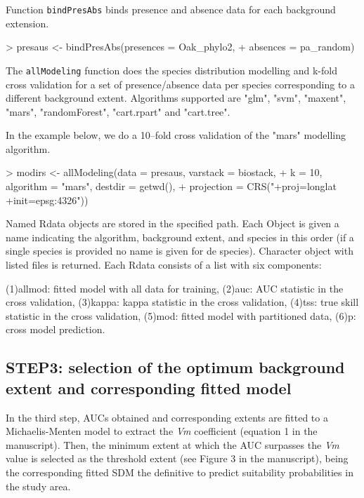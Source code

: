 \documentclass[10pt,a4paper]{article}
\begin{document}
Function \texttt{bindPresAbs} binds presence and absence data for each background extension.

\begin{Schunk}
\begin{Sinput}
> presaus <- bindPresAbs(presences = Oak_phylo2, 
+                        absences = pa_random)
\end{Sinput}
\end{Schunk}


The \texttt{allModeling} function does the species distribution modelling and k-fold cross validation for a set of presence/absence data per species corresponding to a different background 
extent. Algorithms supported are "glm", "svm", "maxent", "mars", "randomForest", "cart.rpart" 
and "cart.tree".

In the example below, we do a 10--fold cross validation of the "mars" modelling algorithm.

\begin{Schunk}
\begin{Sinput}
> modirs <- allModeling(data = presaus, varstack = biostack, 
+             k = 10, algorithm = "mars", destdir = getwd(), 
+             projection = CRS("+proj=longlat +init=epsg:4326"))
\end{Sinput}
\end{Schunk}

Named Rdata objects are stored in the specified path. Each Object is given a name indicating the algorithm, background extent, and species in this order (if a single species is provided no name is given for de species). Character object with listed files is returned. Each Rdata consists of a list with six components:

	(1)allmod: fitted model with all data for training, 
	(2)auc: AUC statistic in the cross validation,
	(3)kappa: kappa statistic in the cross validation,
	(4)tss: true skill statistic in the cross validation,
	(5)mod: fitted model with partitioned data, 
	(6)p: cross model prediction. 

\subsection{STEP3: selection of the optimum background extent and corresponding fitted model}

In the third step, AUCs obtained and corresponding extents are fitted to a Michaelis-Menten model to extract the \textit{Vm} coefficient (equation 1 in the manuscript). Then, the minimum extent at which the AUC surpasses the \textit{Vm} value is selected as the threshold extent (see Figure 3 in the manuscript), being the corresponding fitted SDM the definitive to predict suitability probabilities in the study area.
\end{document}
